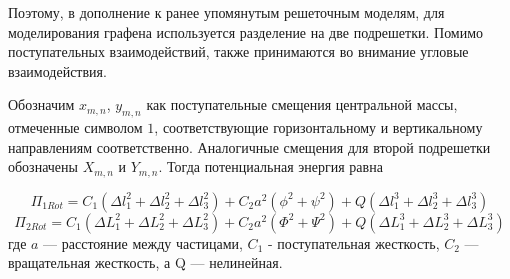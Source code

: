 
Поэтому, в дополнение к ранее упомянутым решеточным моделям, для моделирования графена используется разделение на две подрешетки. Помимо поступательных взаимодействий, также принимаются во внимание угловые взаимодействия.

Обозначим $x_{m, n}$, $y_{m, n}$ как поступательные смещения центральной массы, отмеченные символом $1$, соответствующие горизонтальному и вертикальному направлениям соответственно. Аналогичные смещения для второй подрешетки обозначены $X_{m, n}$ и $Y_{m, n}$. Тогда потенциальная энергия равна \cite{poros19}

\[
\Pi_{1Rot}  = C_1(\Delta l_1^2 + \Delta l_2^2 + \Delta l_3^2) + C_2 a^2(\phi^2+\psi^2)+ Q(\Delta l_1^3 + \Delta l_2^3 + \Delta l_3^3)
\]
\begin{equation}
	\Pi_{2Rot} = C_1(\Delta L_1^2 + \Delta L_2^2 + \Delta L_3^2)+ C_2 a^2(\Phi^2+\Psi^2)+
	Q(\Delta L_1^3 + \Delta L_2^3 + \Delta L_3^3)
\end{equation}
где $a$ --- расстояние между частицами, $C_1$ - поступательная жесткость, $C_2$ --- вращательная жесткость, а Q --- нелинейная.

